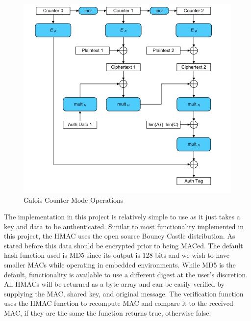 \begin{figure}[t]
	\centering
	\includegraphics[width=12cm,height=0.7\textheight,keepaspectratio]{./figures/figure_6}
	\center\caption[font=footnote]{Galois Counter Mode Operations}
\end{figure}

The implementation in this project is relatively simple to use as it just takes a key and data to be authenticated. Similar to most functionality implemented in this project, the HMAC uses the open source Bouncy Castle distribution. As stated before this data should be encrypted prior to being MACed. The  default hash function used is MD5 since its output is 128 bits and we wish to have smaller MACs while operating in embedded environments. While MD5 is the default, functionality is available to use a different digest at the user's discretion. All HMACs will be returned as a byte array and can be easily verified by supplying the MAC, shared key, and original message. The verification function uses the HMAC function to recompute MAC and compare it to the received MAC, if they are the same the function returns true, otherwise false. 


